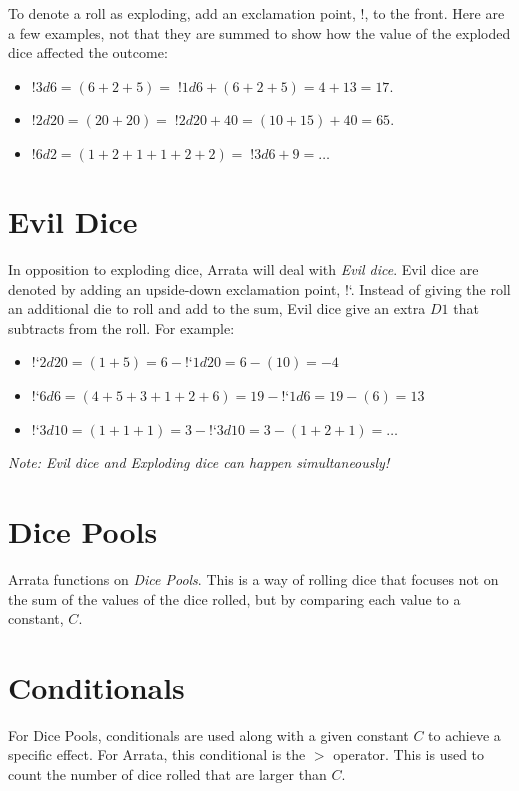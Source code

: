 \documentclass[../main.tex]{subfiles}
\begin{document}
    To denote a roll as exploding, add an exclamation point, $!$, to the front. Here are a few examples, not that they are summed to show how the value of the exploded dice affected the outcome:

    \begin{itemize}
        \item $!3d6 = (6 + 2 + 5) =\; !1d6 + (6 + 2 + 5) = 4 + 13 = 17$.
        \item $!2d20 = (20 + 20) =\; !2d20 + 40 = (10 + 15) + 40 = 65$.
        \item $!6d2 = (1 + 2 + 1 + 1 + 2 + 2) =\; !3d6 + 9 = \dots$
    \end{itemize}

    \section{Evil Dice}

    In opposition to exploding dice, Arrata will deal with {\em Evil dice}. Evil dice are denoted by adding an upside-down exclamation point, !`. Instead of giving the roll an additional die to roll and add to the sum, Evil dice give an extra $D1$ that subtracts from the roll. For example:

    \begin{itemize}
        \item!`$2d20 = (1 + 5) = 6 - $!`$1d20 = 6 - (10) = -4$
        \item!`$6d6 = (4 + 5 + 3 + 1 + 2 + 6) = 19 - $!`$1d6 = 19 - (6) = 13$
        \item!`$3d10 = (1 + 1 + 1) = 3 - $!`$3d10 = 3 - (1 + 2 + 1) = \dots$
    \end{itemize}

    {\em Note: Evil dice and Exploding dice can happen simultaneously!}

    \section{Dice Pools}

    Arrata functions on {\em Dice Pools}. This is a way of rolling dice that focuses not on the sum of the values of the dice rolled, but by comparing each value to a constant, $C$.

    \section{Conditionals}

    For Dice Pools, conditionals are used along with a given constant $C$ to achieve a specific effect. For Arrata, this conditional is the $>$ operator. This is used to count the number of dice rolled that are larger than $C$.
\end{document}
